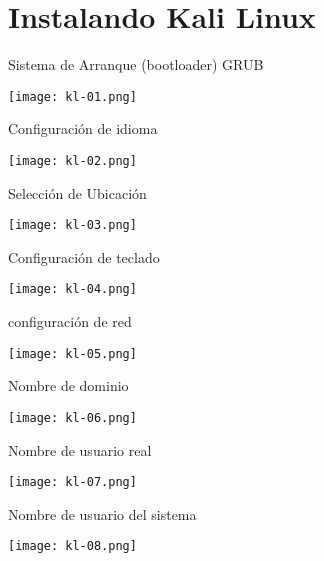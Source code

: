 \section{Instalando Kali Linux}

\begin{frame}[c]{Sistema de Arranque (bootloader) GRUB}
  \begin{center}
    \texttt{[image: kl-01.png]}
  \end{center}
\end{frame}

\begin{frame}[c]{Configuración de idioma}
  \begin{center}
    \texttt{[image: kl-02.png]}
  \end{center}
\end{frame}

\begin{frame}[c]{Selección de Ubicación}
  \begin{center}
    \texttt{[image: kl-03.png]}
  \end{center}
\end{frame}

\begin{frame}[c]{Configuración de teclado}
  \begin{center}
    \texttt{[image: kl-04.png]}
  \end{center}
\end{frame}

\begin{frame}[c]{configuración de red}
  \begin{center}
    \texttt{[image: kl-05.png]}
  \end{center}
\end{frame}

\begin{frame}[c]{Nombre de dominio}
  \begin{center}
    \texttt{[image: kl-06.png]}
  \end{center}
\end{frame}

\begin{frame}[c]{Nombre de usuario real}
  \begin{center}
    \texttt{[image: kl-07.png]}
  \end{center}
\end{frame}

\begin{frame}[c]{Nombre de usuario del sistema}
  \begin{center}
    \texttt{[image: kl-08.png]}
  \end{center}
\end{frame}


